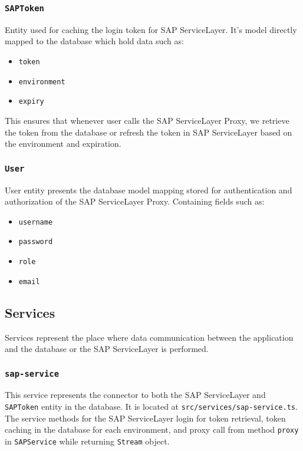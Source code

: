 \subsubsection{\texttt{SAPToken}}
Entity used for caching the login token for SAP ServiceLayer. 
It's model directly mapped to the database which hold data such as:
\begin{itemize}
    \item \texttt{token}
    \item \texttt{environment}
    \item \texttt{expiry}
\end{itemize}

This ensures that whenever user calls the SAP ServiceLayer Proxy, we retrieve the token from the database or refresh the token in SAP ServiceLayer based on the environment and expiration.


\subsubsection{\texttt{User}}
User entity presents the database model mapping stored for authentication and authorization of the SAP ServiceLayer Proxy.
Containing fields such as:
\begin{itemize}
    \item \texttt{username}
    \item \texttt{password}
    \item \texttt{role}
    \item \texttt{email}
\end{itemize}

\subsection{Services}
\label{attachments:programming-sap.overview.sevices}
Services represent the place where data communication between the application and the database or the SAP ServiceLayer is performed.

\subsubsection{\texttt{sap-service}}
This service represents the connector to both the SAP ServiceLayer and \texttt{SAPToken} entity in the database.
It is located at \texttt{src/services/sap-service.ts}.
The service methods for the SAP ServiceLayer login for token retrieval, token caching in the database for each environment, and proxy call from method \texttt{proxy} in \texttt{SAPService} while returning \texttt{Stream} object.


